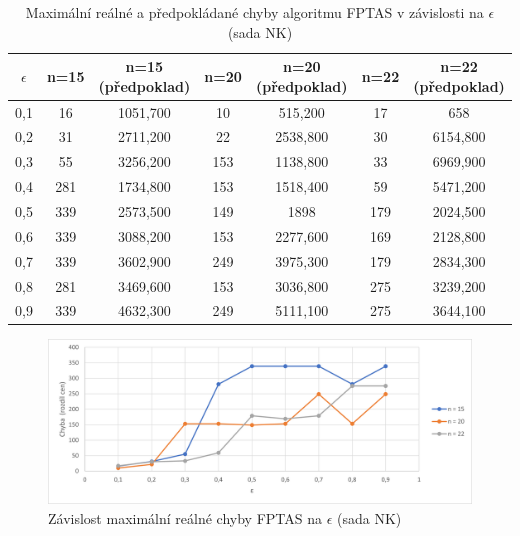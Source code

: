 \documentclass[12pt]{article}
\begin{document}
\begin{table}
    \begin{center}
         \begin{tabular}{|c | c | c | c | c | c | c|} 
         \hline
         $\epsilon$ & n=15 & n=15 (předpoklad) & n=20 & n=20 (předpoklad) & n=22 & n=22 (předpoklad) \\ [0.1ex] 
         \hline\hline
        0,1 & 16 & 1051,700 & 10 & 515,200 & 17 & 658 \\
        \hline
        0,2 & 31 & 2711,200 & 22 & 2538,800 & 30 & 6154,800 \\
        \hline
        0,3 & 55 & 3256,200 & 153 & 1138,800 & 33 & 6969,900 \\
        \hline
        0,4 & 281 & 1734,800 & 153 & 1518,400 & 59 & 5471,200 \\
        \hline
        0,5 & 339 & 2573,500 & 149 & 1898 & 179 & 2024,500 \\
        \hline
        0,6 & 339 & 3088,200 & 153 & 2277,600 & 169 & 2128,800 \\
        \hline
        0,7 & 339 & 3602,900 & 249 & 3975,300 & 179 & 2834,300 \\
        \hline
        0,8 & 281 & 3469,600 & 153 & 3036,800 & 275 & 3239,200 \\
        \hline
        0,9 & 339 & 4632,300 & 249 & 5111,100 & 275 & 3644,100 \\
        \hline
        \end{tabular}
        \caption{Maximální reálné a předpokládané chyby algoritmu FPTAS v závislosti na $\epsilon$ (sada NK)} \label{tab:nk_fptas_eps_error}
    \end{center}
\end{table}

\begin{figure}[ht]\centering
    \includegraphics[width=1\textwidth, keepaspectratio]{graphs/NK/fptas/nk_fptas_eps_error.png}
    \caption{Závislost maximální reálné chyby FPTAS na $\epsilon$ (sada NK)}
    \label{fig:nk_fptas_eps_error}
\end{figure}
\end{document}
